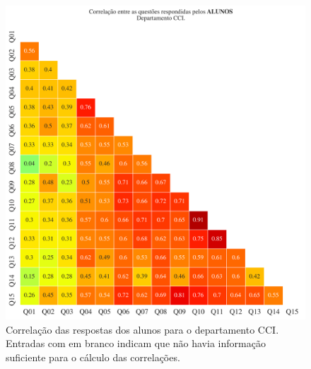 \documentclass[a4paper,10pt]{article}
\begin{document}
\begin{figure}[h]
\centering
\includegraphics[width=0.999\linewidth]{matriz_corr__CCI_alunos.png}
\caption{\label{fig:corr_alunos}Correlação das respostas dos alunos para o departamento CCI. Entradas com em branco indicam que não havia informação suficiente para o cálculo das correlações.}
\end{figure}
\end{document}

